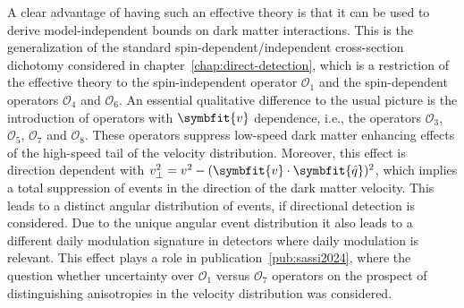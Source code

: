 \documentclass[b5paper, 10pt, twoside]{book}
\renewcommand{\vec}[1]{\symbfit{#1}}
\newcommand{\unitv}[1]{\symbfit{\hat{#1}}}
\begin{document}
A clear advantage of having such an effective theory is that it can be used to derive model-independent bounds on dark matter interactions. This is the generalization of the standard spin-dependent/independent cross-section dichotomy considered in chapter~\ref{chap:direct-detection}, which is a restriction of the effective theory to the spin-independent operator $\mathcal{O}_1$ and the spin-dependent operators $\mathcal{O}_4$ and $\mathcal{O}_6$. An essential qualitative difference to the usual picture is the introduction of operators with $\vec{v}$ dependence, i.e., the operators $\mathcal{O}_3$, $\mathcal{O}_5$, $\mathcal{O}_7$ and $\mathcal{O}_8$. These operators suppress low-speed dark matter enhancing effects of the high-speed tail of the velocity distribution. Moreover, this effect is direction dependent with $v_\perp^2=v^2-(\vec{v}\cdot\unitv{q})^2$, which implies a total suppression of events in the direction of the dark matter velocity. This leads to a distinct angular distribution of events, if directional detection is considered. Due to the unique angular event distribution it also leads to a different daily modulation signature in detectors where daily modulation is relevant. This effect plays a role in publication~\ref{pub:sassi2024}, where the question whether uncertainty over $\mathcal{O}_1$ versus $\mathcal{O}_7$ operators on the prospect of distinguishing anisotropies in the velocity distribution was considered.
\end{document}
